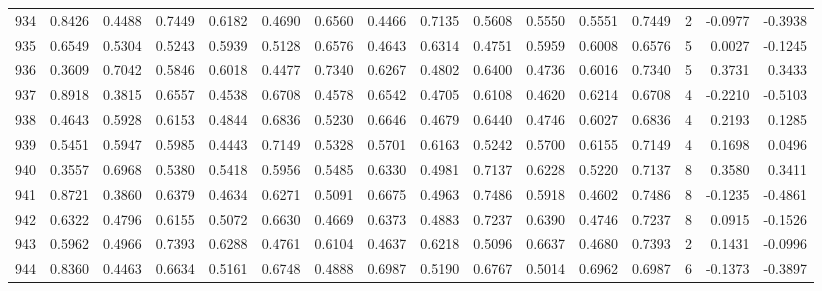 \begin{tabular}{lrrrrrrrrrrrrrrr}
934 &      0.8426 &  0.4488 &  0.7449 &  0.6182 &  0.4690 &  0.6560 &  0.4466 &  0.7135 &  0.5608 &  0.5550 &   0.5551 &     0.7449 &      2 &                   -0.0977 &                    -0.3938 \\
935 &      0.6549 &  0.5304 &  0.5243 &  0.5939 &  0.5128 &  0.6576 &  0.4643 &  0.6314 &  0.4751 &  0.5959 &   0.6008 &     0.6576 &      5 &                    0.0027 &                    -0.1245 \\
936 &      0.3609 &  0.7042 &  0.5846 &  0.6018 &  0.4477 &  0.7340 &  0.6267 &  0.4802 &  0.6400 &  0.4736 &   0.6016 &     0.7340 &      5 &                    0.3731 &                     0.3433 \\
937 &      0.8918 &  0.3815 &  0.6557 &  0.4538 &  0.6708 &  0.4578 &  0.6542 &  0.4705 &  0.6108 &  0.4620 &   0.6214 &     0.6708 &      4 &                   -0.2210 &                    -0.5103 \\
938 &      0.4643 &  0.5928 &  0.6153 &  0.4844 &  0.6836 &  0.5230 &  0.6646 &  0.4679 &  0.6440 &  0.4746 &   0.6027 &     0.6836 &      4 &                    0.2193 &                     0.1285 \\
939 &      0.5451 &  0.5947 &  0.5985 &  0.4443 &  0.7149 &  0.5328 &  0.5701 &  0.6163 &  0.5242 &  0.5700 &   0.6155 &     0.7149 &      4 &                    0.1698 &                     0.0496 \\
940 &      0.3557 &  0.6968 &  0.5380 &  0.5418 &  0.5956 &  0.5485 &  0.6330 &  0.4981 &  0.7137 &  0.6228 &   0.5220 &     0.7137 &      8 &                    0.3580 &                     0.3411 \\
941 &      0.8721 &  0.3860 &  0.6379 &  0.4634 &  0.6271 &  0.5091 &  0.6675 &  0.4963 &  0.7486 &  0.5918 &   0.4602 &     0.7486 &      8 &                   -0.1235 &                    -0.4861 \\
942 &      0.6322 &  0.4796 &  0.6155 &  0.5072 &  0.6630 &  0.4669 &  0.6373 &  0.4883 &  0.7237 &  0.6390 &   0.4746 &     0.7237 &      8 &                    0.0915 &                    -0.1526 \\
943 &      0.5962 &  0.4966 &  0.7393 &  0.6288 &  0.4761 &  0.6104 &  0.4637 &  0.6218 &  0.5096 &  0.6637 &   0.4680 &     0.7393 &      2 &                    0.1431 &                    -0.0996 \\
944 &      0.8360 &  0.4463 &  0.6634 &  0.5161 &  0.6748 &  0.4888 &  0.6987 &  0.5190 &  0.6767 &  0.5014 &   0.6962 &     0.6987 &      6 &                   -0.1373 &                    -0.3897 \\

\end{tabular}
